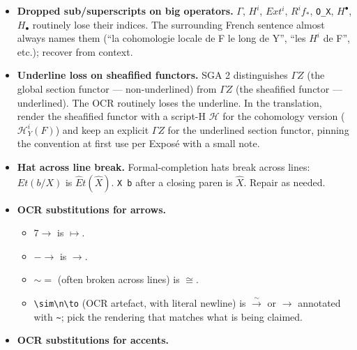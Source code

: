 \documentclass[
]{article}
\providecommand{\tightlist}{%
  \setlength{\itemsep}{0pt}\setlength{\parskip}{0pt}}
\begin{document}
\begin{itemize}
\tightlist
\item
  \textbf{Dropped sub/superscripts on big operators.} \(\Gamma\),
  \(H^{i}\), \(Ext^{i}\), \(R^{i} f_{*}\), \texttt{O\_X},
  \(H^{\bullet}\), \(H_{\bullet}\) routinely lose their indices. The
  surrounding French sentence almost always names them (``la cohomologie
  locale de F le long de Y'', ``les \(H^{i}\) de F'', etc.); recover
  from context.
\item
  \textbf{Underline loss on sheafified functors.} SGA 2 distinguishes
  \(\Gamma Z\) (the global section functor --- non-underlined) from
  \(\Gamma Z\) (the sheafified functor --- underlined). The OCR
  routinely loses the underline. In the translation, render the
  sheafified functor with a script-H \(\mathcal{H}\) for the cohomology
  version (\(\mathcal{H}^{i}_{Y}(F)\)) and keep an explicit \(\Gamma Z\)
  for the underlined section functor, pinning the convention at first
  use per Exposé with a small note.
\item
  \textbf{Hat across line break.} Formal-completion hats break across
  lines: \(Et( b / X)\) is \(\hat{E}t(\hat{X})\). \texttt{X\ b} after a
  closing paren is \(\hat{X}\). Repair as needed.
\item
  \textbf{OCR substitutions for arrows.}

  \begin{itemize}
  \tightlist
  \item
    \(7\to\) is \(\mapsto\).
  \item
    \(-\to\) is \(\to\).
  \item
    \(\sim=\) (often broken across lines) is \(\cong\).
  \item
    \texttt{\textbackslash{}sim\textbackslash{}n\textbackslash{}to} (OCR
    artefact, with literal newline) is \(\xrightarrow{\sim}\) or \(\to\)
    annotated with \texttt{\textasciitilde{}}; pick the rendering that
    matches what is being claimed.
  \end{itemize}
\item
  \textbf{OCR substitutions for accents.}


\end{itemize}
\end{document}
